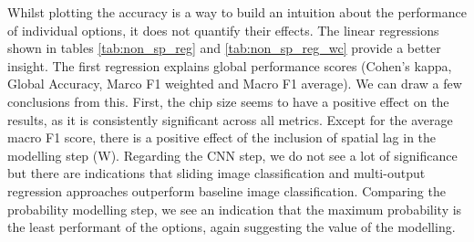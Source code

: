 Whilst plotting the accuracy is a way to build an intuition about the performance of
individual options, it does not quantify their effects. The linear regressions shown in
tables \ref{tab:non_sp_reg} and \ref{tab:non_sp_reg_wc} provide a better insight. The
first regression explains global performance scores (Cohen's kappa, Global Accuracy, Marco F1
weighted and Macro F1 average). We can draw a few conclusions from this. First, the chip size
seems to have a positive effect on the results, as it is consistently
significant across all metrics. Except for the average macro F1 score, there is a
positive effect of the inclusion of spatial lag in the modelling step (W). Regarding the
CNN step, we do not see a lot of significance but there are indications that sliding
image classification and multi-output regression approaches outperform baseline image
classification. Comparing the probability modelling step, we see an indication that the
maximum probability is the least performant of the options, again suggesting the value
of the modelling.


